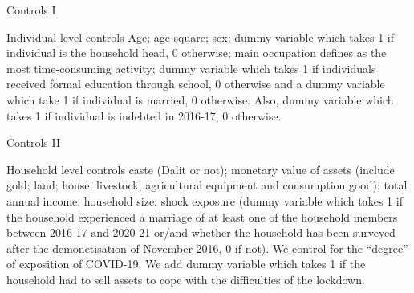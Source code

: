 \documentclass[aspectratio=169]{beamer}
\begin{document}
\begin{frame}[noframenumbering]{Controls I}
\label{frame:control}

\hyperlink{frame:empirical1}{}

\begin{greenbox}{Individual level controls}
Age; age square; sex; dummy variable which takes 1 if individual is the household head, 0 otherwise; main occupation defines as the most time-consuming activity; dummy variable which takes 1 if individuals received formal education through school, 0 otherwise and a dummy variable which take 1 if individual is married, 0 otherwise.
Also, dummy variable which takes 1 if individual is indebted in 2016-17, 0 otherwise.
\end{greenbox}

\end{frame}


\begin{frame}[noframenumbering]{Controls II}
\label{frame:control}

\hyperlink{frame:empirical1}{}

\begin{greenbox}{Household level controls}
caste (Dalit or not); monetary value of assets (include gold; land; house; livestock; agricultural equipment and consumption good); total annual income; household size; shock exposure (dummy variable which takes 1 if the household experienced a marriage of at least one of the household members between 2016-17 and 2020-21 or/and whether the household has been surveyed after the demonetisation of November 2016, 0 if not). 
We control for the ``degree'' of exposition of COVID-19.
We add dummy variable which takes 1 if the household had to sell assets to cope with the difficulties of the lockdown.
\end{greenbox}

\end{frame}
\end{document}
